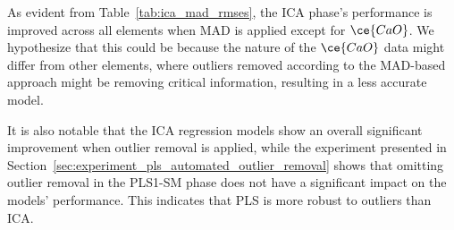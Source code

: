 As evident from Table~\ref{tab:ica_mad_rmses}, the ICA phase's performance is improved across all elements when MAD is applied except for $\ce{CaO}$.
We hypothesize that this could be because the nature of the $\ce{CaO}$ data might differ from other elements, where outliers removed according to the MAD-based approach might be removing critical information, resulting in a less accurate model.

It is also notable that the ICA regression models show an overall significant improvement when outlier removal is applied, while the experiment presented in Section~\ref{sec:experiment_pls_automated_outlier_removal} shows that omitting outlier removal in the PLS1-SM phase does not have a significant impact on the models' performance.
This indicates that PLS is more robust to outliers than ICA.